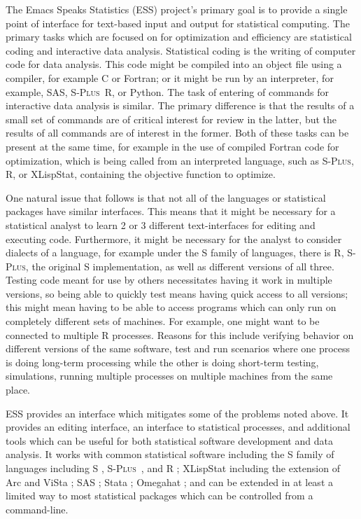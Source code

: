 \documentclass{article}
\newcommand*{\Splus}{\textsc{S-Plus}}
\begin{document}
The Emacs Speaks Statistics (ESS) project's primary goal is to provide
a single point of interface for text-based input and output for
statistical computing.  The primary tasks which are focused on for
optimization and efficiency are statistical coding and interactive
data analysis.  Statistical coding is the writing of computer code for
data analysis.  This code might be compiled into an object file using
a compiler, for example C or Fortran; or it might be run by an
interpreter, for example, SAS, \Splus\, R, or Python.  The task of
entering of commands for interactive data analysis is similar.  The
primary difference is that the results of a small set of commands are
of critical interest for review in the latter, but the results of all
commands are of interest in the former.  Both of these tasks can be
present at the same time, for example in the use of compiled Fortran
code for optimization, which is being called from an interpreted
language, such as \Splus, R, or XLispStat, containing the objective
function to optimize.

One natural issue that follows is that not all of the languages or
statistical packages have similar interfaces.  This means that it
might be necessary for a statistical analyst to learn 2 or 3 different
text-interfaces for editing and executing code.  Furthermore, it might
be necessary for the analyst to consider dialects of a language, for
example under the S family of languages, there is R, \Splus, the
original S implementation, as well as different versions of all three.
Testing code meant for use by others necessitates having it work in
multiple versions, so being able to quickly test means having quick
access to all versions; this might mean having to be able to access
programs which can only run on completely different sets of machines.
For example, one might want to be connected to multiple R processes.
Reasons for this include verifying behavior on different versions of
the same software, test and run scenarios where one process is doing
long-term processing while the other is doing short-term testing,
simulations, running multiple processes on multiple machines from the
same place.

ESS provides an interface which mitigates some of the problems noted
above.  It provides an editing interface, an interface to statistical
processes, and additional tools which can be useful for both
statistical software development and data analysis.  It works with
common statistical software including the S family of languages
including S \citep{BecRCW88,ChaJH92,ChaJ98}, \Splus\ \citep{Splus},
and R \citep{ihak:gent:1996}; XLispStat \citep{Tier90} including the
extension of Arc \citep{Cook:Weisberg:1999} and ViSta
\citep{youn:fald:mcfa:1992}; SAS \citep{SAS:8.0}; Stata
\citep{Stata:6.0}; Omegahat \citep{DTLang:2000}; and can be extended
in at least a limited way to most statistical packages which can be
controlled from a command-line.
\end{document}
